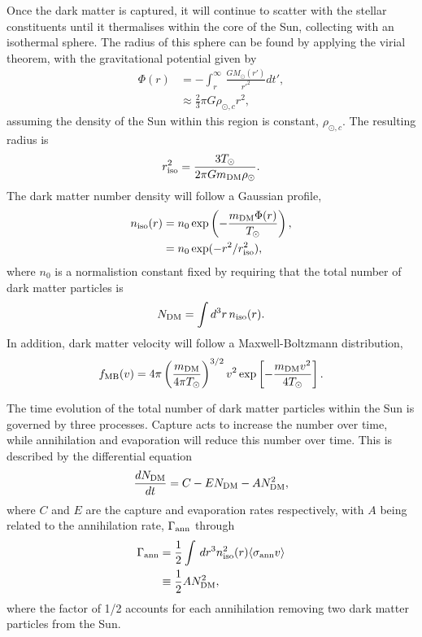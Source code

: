 Once the dark matter is captured, it will continue to scatter with the stellar constituents until it thermalises within the core of the Sun, collecting with an isothermal sphere. The radius of this sphere can be found by applying the virial theorem, with the gravitational potential given by
\begin{align}
    \Phi(r) & = -\int_r^\infty \,\frac{G M_\odot(r')}{r'^2}dt',\\
    &\approx \frac{2}{3}\pi G \rho_{\odot,c} r^2,
\end{align}
assuming the density of the Sun within this region is constant, $\rho_{\odot,c}$. The resulting radius is
\begin{equation}
    r_\mathrm{iso}^2 = \frac{3 T_\odot}{2\pi G m_\mathrm{DM} \rho_\odot}.
\end{equation}
The dark matter number density will follow a Gaussian profile, 
\begin{align}
    n_\mathrm{iso}(r) &= n_0\exp\left( - \frac{m_\mathrm{DM} \Phi(r)}{T_\odot}\right),\\
     & = n_0 \exp(-r^2/r_\mathrm{iso}^2),
\end{align}
where $n_0$ is a normalistion constant fixed by requiring that the total number of dark matter particles is 
\begin{equation}
    N_\mathrm{DM} = \int d^3 r\, n_\mathrm{iso}(r).
\end{equation}
In addition, dark matter velocity will follow a Maxwell-Boltzmann distribution, 
\begin{equation}
    f_{\rm MB}(v) = 4\pi\left(\frac{m_\mathrm{DM}}{4\pi T_\odot}\right)^{3/2}v^2\exp\left[-\frac{m_\mathrm{DM} v^2}{4 T_\odot}\right].
\end{equation}

The time evolution of the total number of dark matter particles within the Sun is governed by three processes. Capture acts to increase the number over time, while annihilation and evaporation will reduce this number over time. This is described by the differential equation
\begin{equation}
    \frac{d N_\mathrm{DM}}{dt} = C  - E N_\mathrm{DM}- A N_\mathrm{DM}^2,
    \label{eq:DM_num_Sun}
\end{equation}
where $C$ and $E$ are the capture and evaporation rates respectively, with $A$ being related to the annihilation rate, $\Gamma_\mathrm{ann}$ through
\begin{align}
    \Gamma_\mathrm{ann} & = \frac{1}{2}\int\,dr^3 n_\mathrm{iso}^2(r) \langle \sigma_{\rm ann} v \rangle\\
    & \equiv \frac{1}{2}A N_\mathrm{DM}^2,
\end{align}
where the factor of 1/2 accounts for each annihilation removing two dark matter particles from the Sun. 

